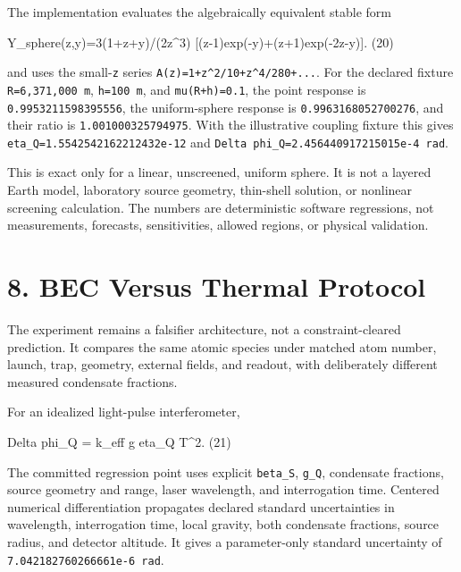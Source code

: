 \documentclass[
  american,
  11pt,
  letterpaper,
]{article}
\newenvironment{Shaded}{}{}
\newcommand{\NormalTok}[1]{#1}
\begin{document}
The implementation evaluates the algebraically equivalent stable form

\begin{Shaded}
\begin{Highlighting}[]
\NormalTok{Y\_sphere(z,y)=3(1+z+y)/(2z\^{}3)}
\NormalTok{               [(z{-}1)exp({-}y)+(z+1)exp({-}2z{-}y)].                 (20)}
\end{Highlighting}
\end{Shaded}

and uses the small-\texttt{z} series \texttt{A(z)=1+z\^{}2/10+z\^{}4/280+...}. For the declared fixture \texttt{R=6,371,000\ m}, \texttt{h=100\ m}, and \texttt{mu(R+h)=0.1}, the point response is \nolinkurl{0.9953211598395556}, the uniform-sphere response is \nolinkurl{0.9963168052700276}, and their ratio is \texttt{1.001000325794975}. With the illustrative coupling fixture this gives \nolinkurl{eta_Q=1.5542542162212432e-12} and \texttt{Delta\ phi\_Q=2.456440917215015e-4\ rad}.

This is exact only for a linear, unscreened, uniform sphere. It is not a layered Earth model, laboratory source geometry, thin-shell solution, or nonlinear screening calculation. The numbers are deterministic software regressions, not measurements, forecasts, sensitivities, allowed regions, or physical validation.

\section{8. BEC Versus Thermal Protocol}\label{bec-versus-thermal-protocol}

The experiment remains a falsifier architecture, not a constraint-cleared prediction. It compares the same atomic species under matched atom number, launch, trap, geometry, external fields, and readout, with deliberately different measured condensate fractions.

For an idealized light-pulse interferometer,

\begin{Shaded}
\begin{Highlighting}[]
\NormalTok{Delta phi\_Q = k\_eff g eta\_Q T\^{}2.                                (21)}
\end{Highlighting}
\end{Shaded}

The committed regression point uses explicit \texttt{beta\_S}, \texttt{g\_Q}, condensate fractions, source geometry and range, laser wavelength, and interrogation time. Centered numerical differentiation propagates declared standard uncertainties in wavelength, interrogation time, local gravity, both condensate fractions, source radius, and detector altitude. It gives a parameter-only standard uncertainty of \texttt{7.042182760266661e-6\ rad}.
\end{document}
